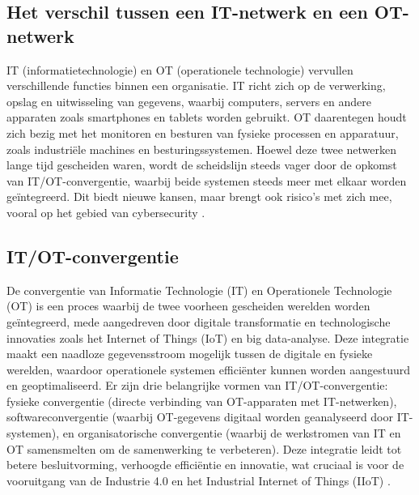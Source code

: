 \subsection{Het verschil tussen een IT-netwerk en een OT-netwerk}
IT (informatietechnologie) en OT (operationele technologie) vervullen verschillende functies binnen een organisatie. IT richt zich op de verwerking, opslag en 
uitwisseling van gegevens, waarbij computers, servers en andere apparaten zoals smartphones en tablets worden gebruikt. OT daarentegen houdt zich bezig met het 
monitoren en besturen van fysieke processen en apparatuur, zoals industriële machines en besturingssystemen. Hoewel deze twee netwerken lange tijd gescheiden waren, 
wordt de scheidslijn steeds vager door de opkomst van IT/OT-convergentie, waarbij beide systemen steeds meer met elkaar worden geïntegreerd. Dit biedt nieuwe kansen, 
maar brengt ook risico’s met zich mee, vooral op het gebied van cybersecurity \autocite{onlogic2023}.

\subsection{IT/OT-convergentie}
De convergentie van Informatie Technologie (IT) en Operationele Technologie (OT) is een proces waarbij de twee voorheen gescheiden werelden worden geïntegreerd, mede aangedreven door digitale 
transformatie en technologische innovaties zoals het Internet of Things (IoT) en big data-analyse. Deze integratie maakt een naadloze gegevensstroom mogelijk tussen de digitale en fysieke werelden, 
waardoor operationele systemen efficiënter kunnen worden aangestuurd en geoptimaliseerd. Er zijn drie belangrijke vormen van IT/OT-convergentie: fysieke convergentie (directe verbinding van OT-apparaten met IT-netwerken), 
softwareconvergentie (waarbij OT-gegevens digitaal worden geanalyseerd door IT-systemen), en organisatorische convergentie (waarbij de werkstromen van IT en OT samensmelten om de samenwerking te verbeteren). Deze integratie 
leidt tot betere besluitvorming, verhoogde efficiëntie en innovatie, wat cruciaal is voor de vooruitgang van de Industrie 4.0 en het Industrial Internet of Things (IIoT) \autocite{maleh2021ot,paloaltonetworks2023}.

